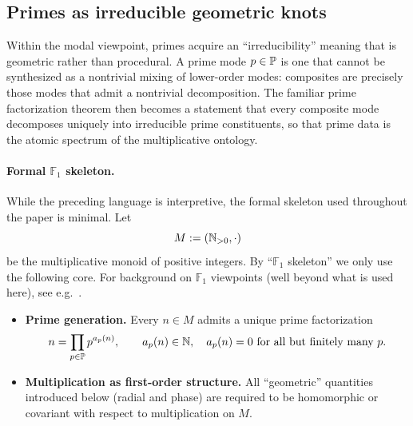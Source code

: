 \subsection{Primes as irreducible geometric knots}
Within the modal viewpoint, primes acquire an ``irreducibility'' meaning that is geometric rather than procedural.
A prime mode $p\in\mathbb{P}$ is one that cannot be synthesized as a nontrivial mixing of lower-order modes: composites are precisely those modes that admit a nontrivial decomposition.
The familiar prime factorization theorem then becomes a statement that every composite mode decomposes uniquely into irreducible prime constituents, so that prime data is the atomic spectrum of the multiplicative ontology.

\paragraph{Formal \texorpdfstring{$\mathbb{F}_1$}{F1} skeleton.}
While the preceding language is interpretive, the formal skeleton used throughout the paper is minimal.
Let
$$
M := (\mathbb{N}_{>0},\cdot)
$$
be the multiplicative monoid of positive integers.
By ``$\mathbb{F}_1$ skeleton'' we only use the following core.
For background on $\mathbb{F}_1$ viewpoints (well beyond what is used here), see e.g.~\cite{Deitmar2005}.

\begin{itemize}
    \item \textbf{Prime generation.} Every $n\in M$ admits a unique prime factorization
    $$
    n=\prod_{p\in\mathbb{P}} p^{a_p(n)},\qquad a_p(n)\in\mathbb{N},\quad a_p(n)=0\text{ for all but finitely many }p.
    $$
    \item \textbf{Multiplication as first-order structure.} All ``geometric'' quantities introduced below (radial and phase) are required to be homomorphic or covariant with respect to multiplication on $M$.
\end{itemize}
